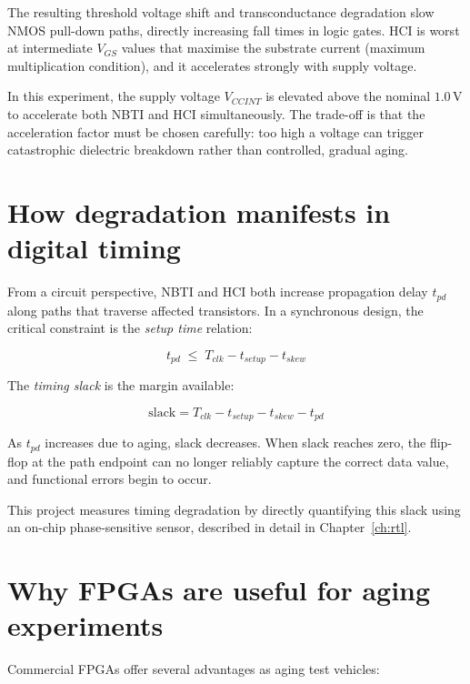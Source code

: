 \documentclass[12pt, a4paper]{report}
\begin{document}
The resulting threshold voltage shift and transconductance degradation slow NMOS
pull-down paths, directly increasing fall times in logic gates. HCI is worst at
intermediate $V_{GS}$ values that maximise the substrate current (maximum multiplication
condition), and it accelerates strongly with supply voltage.

In this experiment, the supply voltage $V_{CCINT}$ is elevated above the nominal
$1.0\,\text{V}$ to accelerate both NBTI and HCI simultaneously. The trade-off is that
the acceleration factor must be chosen carefully: too high a voltage can trigger
catastrophic dielectric breakdown rather than controlled, gradual aging.

\section{How degradation manifests in digital timing}

From a circuit perspective, NBTI and HCI both increase propagation delay $t_{pd}$
along paths that traverse affected transistors. In a synchronous design, the critical
constraint is the \emph{setup time} relation:

\begin{equation}
  t_{pd} \;\leq\; T_{clk} - t_{setup} - t_{skew}
\end{equation}

The \emph{timing slack} is the margin available:

\begin{equation}
  \text{slack} = T_{clk} - t_{setup} - t_{skew} - t_{pd}
\end{equation}

As $t_{pd}$ increases due to aging, slack decreases. When slack reaches zero, the
flip-flop at the path endpoint can no longer reliably capture the correct data value,
and functional errors begin to occur.

This project measures timing degradation by directly quantifying this slack using an
on-chip phase-sensitive sensor, described in detail in Chapter~\ref{ch:rtl}.

\section{Why FPGAs are useful for aging experiments}

Commercial FPGAs offer several advantages as aging test vehicles:
\end{document}
